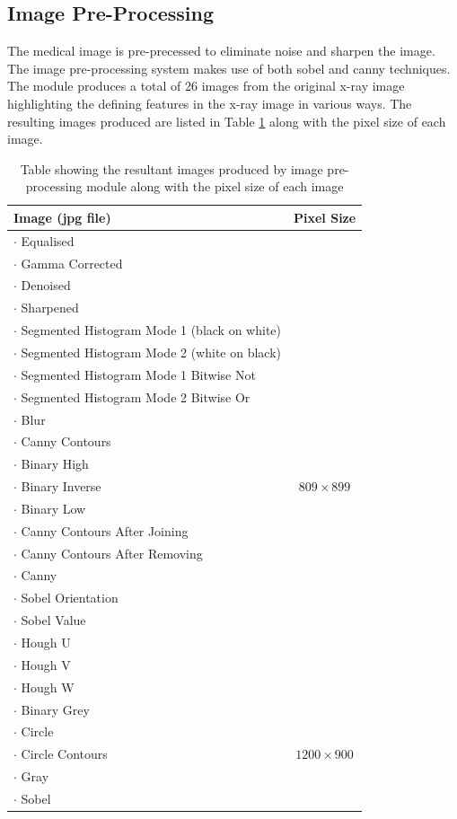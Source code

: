\documentclass[11pt]{article}
\begin{document}
	\subsection{Image Pre-Processing}
	The medical image is pre-precessed to eliminate noise and sharpen the image. The image pre-processing system makes use of both sobel and canny techniques. The module produces a total of 26 images from the original x-ray image highlighting the defining features in the x-ray image in various ways. The resulting images produced are listed in Table \ref{tb: image table} along with the pixel size of each image. 
	\vspace{-3mm}
	\begin{table}[!h]
		\centering
		\caption{Table showing the resultant images produced by image pre-processing module along with the pixel size of each image}
		\label{tb: image table}
		\begin{tabular}{| l | c |}
			\hline
			Image (jpg file) & Pixel Size \\
			\hline \hline
			$\cdot$ Equalised &  \\
			$\cdot$ Gamma Corrected &  \\
			$\cdot$ Denoised & \\
			$\cdot$ Sharpened & \\
			$\cdot$ Segmented Histogram Mode 1 (black on white) & \\
			$\cdot$ Segmented Histogram Mode 2 (white on black) & \\
			$\cdot$ Segmented Histogram Mode 1 Bitwise Not & \\
			$\cdot$ Segmented Histogram Mode 2 Bitwise Or & \\
			$\cdot$ Blur & \\
			$\cdot$ Canny Contours & \\
			$\cdot$ Binary High & \\
			$\cdot$ Binary Inverse & $809 \times 899$ \\
			$\cdot$ Binary Low & \\
			$\cdot$ Canny Contours After Joining & \\
			$\cdot$ Canny Contours After Removing & \\
			$\cdot$ Canny & \\
			$\cdot$ Sobel Orientation & \\
			$\cdot$ Sobel Value & \\
			$\cdot$ Hough U & \\
			$\cdot$ Hough V & \\
			$\cdot$ Hough W & \\
			\hline
			$\cdot$ Binary Grey & \\
			$\cdot$ Circle & \\
			$\cdot$ Circle Contours & $1200 \times 900$ \\
			$\cdot$ Gray & \\
			$\cdot$ Sobel & \\
			\hline
		\end{tabular}
	\end{table}
\end{document}
